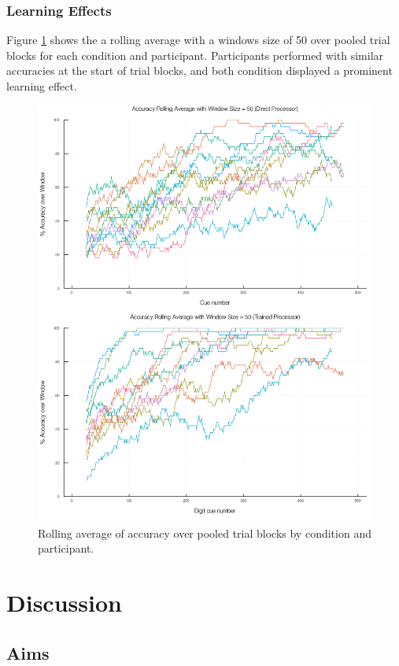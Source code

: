 \documentclass[a4paper,11pt,openany]{book}
\begin{document}
\section*{Learning Effects}
\label{sec:orgabbfc39}

Figure \ref{fig:org07ddf12} shows the a rolling average with a windows size of 50 over pooled trial blocks for each condition and participant.
Participants performed with similar accuracies at the start of trial blocks, and both condition displayed a prominent learning effect.

\begin{figure}[htbp]
\centering
\includegraphics[width=.9\linewidth]{./images/learning_curves.png}
\caption{\label{fig:org07ddf12}
Rolling average of accuracy over pooled trial blocks by condition and participant.}
\end{figure}

\part{Discussion}
\label{sec:org6e7dc44}
\chapter{Aims}
\label{sec:orgdae6927}
\end{document}
